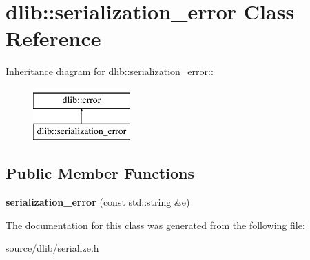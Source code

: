 \hypertarget{classdlib_1_1serialization__error}{
\section{dlib::serialization\_\-error Class Reference}
\label{classdlib_1_1serialization__error}
}
Inheritance diagram for dlib::serialization\_\-error::\begin{figure}[H]
\begin{center}
\leavevmode
\includegraphics[height=2cm]{classdlib_1_1serialization__error}
\end{center}
\end{figure}
\subsection*{Public Member Functions}
\begin{DoxyCompactItemize}
\item 
\hypertarget{classdlib_1_1serialization__error_aa30f46e6b11a5f0bd530267b5a0a5a6a}{
{\bfseries serialization\_\-error} (const std::string \&e)}
\label{classdlib_1_1serialization__error_aa30f46e6b11a5f0bd530267b5a0a5a6a}

\end{DoxyCompactItemize}


The documentation for this class was generated from the following file:\begin{DoxyCompactItemize}
\item 
source/dlib/serialize.h\end{DoxyCompactItemize}
